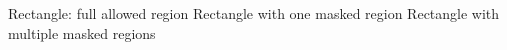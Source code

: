 \documentclass[10pt]{article}
\begin{document}
\noindent Rectangle: full allowed region
\newpage
{}
\noindent Rectangle with one masked region
\newpage
{}
\noindent Rectangle with multiple masked regions
\end{document}
